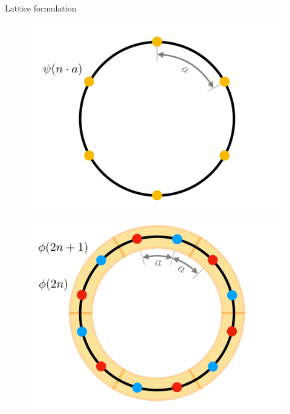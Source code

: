 \begin{frame}[allowframebreaks]{Lattice formulation}
	\begin{figure}[!tbp]
		\centering
		\begin{minipage}[c]{.45\linewidth}
			\centering
			\includegraphics[width=\linewidth]{Figures/chapter02/physical-fermion-lattice}
		\end{minipage}
	  \hspace{.025\linewidth}
		\begin{minipage}[c]{.45\linewidth}
			\centering
			\includegraphics[width=\linewidth]{Figures/chapter02/computational-fermion-lattice}
		\end{minipage}
	\end{figure}

\break


\end{frame}

